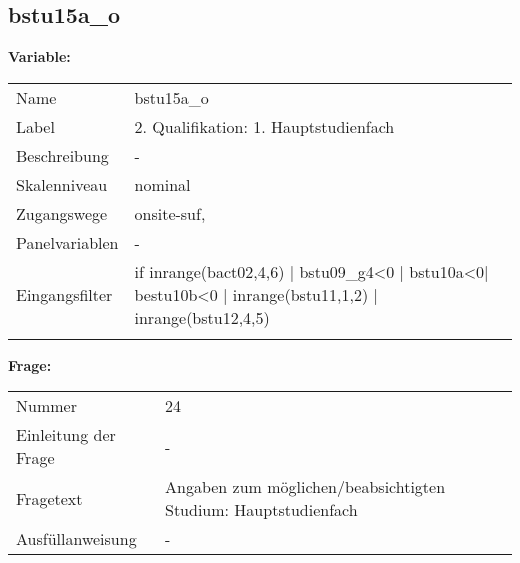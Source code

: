 	
	
	\subsection{bstu15a\_o}
	\label{subSection:bstu15a_o}

	\noindent\textbf{Variable:}\\
		\begin{tabular}{lL{11.3cm}}
			\label{tableVariable:bstu15a_o}
			Name & bstu15a\_o \\
			Label & 2. Qualifikation: 1. Hauptstudienfach \\
			Beschreibung & - \\
			Skalenniveau & nominal \\
			Zugangswege &
				onsite-suf,
 \\
			Panelvariablen & -
			 \\
			Eingangsfilter & if inrange(bact02,4,6) | bstu09\_g4\textless{}0 | bstu10a\textless{}0| bestu10b\textless{}0 | inrange(bstu11,1,2) | inrange(bstu12,4,5) \\
 \\
		\end{tabular}

		\vspace*{1 cm}
		\noindent\textbf{Frage:}\\
		\begin{tabular}{lL{11.3cm}}
			\label{tableQuestion:bstu15a_o}
			Nummer & 24 \\
			Einleitung der Frage & - \\
			Fragetext & Angaben zum möglichen/beabsichtigten Studium:
Hauptstudienfach \\
			Ausfüllanweisung & - \\
		\end{tabular}





